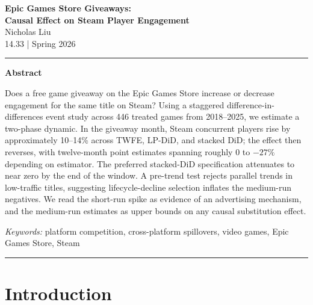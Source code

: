 \documentclass[11pt]{article}
\begin{document}
\doublespacing

\begin{singlespace}
\begin{center}
  {\LARGE\bfseries Epic Games Store Giveaways:\\[0.3em]
   Causal Effect on Steam Player Engagement}\\[1em]
  {\large Nicholas Liu}\\[0.4em]
  {\normalsize 14.33 | Spring 2026}\\[0.4em]
\end{center}

\vspace{0.8em}
\hrule
\vspace{1em}

\begin{center}
  \textbf{Abstract}
\end{center}

\noindent Does a free game giveaway on the Epic Games Store increase or decrease
engagement for the same title on Steam? Using a staggered
difference-in-differences event study across 446 treated games from
2018--2025, we estimate a two-phase dynamic. In the giveaway month, Steam
concurrent players rise by approximately 10--14\% across TWFE, LP-DiD, and
stacked DiD; the effect then reverses, with twelve-month point estimates
spanning roughly $0$ to $-27\%$ depending on estimator. The preferred
stacked-DiD specification attenuates to near zero by the end of the window.
A pre-trend test rejects parallel trends in low-traffic titles, suggesting
lifecycle-decline selection inflates the medium-run negatives. We read the
short-run spike as evidence of an advertising mechanism, and the medium-run
estimates as upper bounds on any causal substitution effect.

\vspace{0.5em}
\noindent\textit{Keywords:} platform competition, cross-platform spillovers, video games, Epic Games Store, Steam

\vspace{1em}
\hrule
\vspace{1em}
\end{singlespace}

\section{Introduction}
\end{document}
